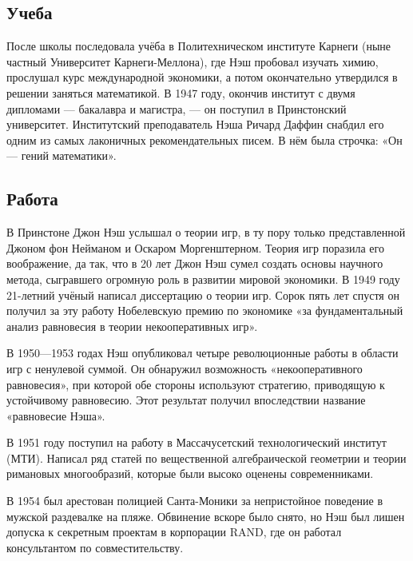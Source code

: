 \documentclass[12pt, a4paper]{article}
\begin{document}
\subsection{Учеба}
После школы последовала учёба в Политехническом институте Карнеги
(ныне частный Университет Карнеги-Меллона), где Нэш пробовал изучать химию,
прослушал курс международной экономики, а потом окончательно утвердился в
решении заняться математикой. В 1947 году, окончив институт с двумя
дипломами — бакалавра и магистра, — он поступил в Принстонский университет.
Институтский преподаватель Нэша Ричард Даффин снабдил его одним из самых
лаконичных рекомендательных писем. В нём была строчка: «Он — гений математики».

\subsection{Работа}
В Принстоне Джон Нэш услышал о теории игр, в ту пору только представленной
Джоном фон Нейманом и Оскаром Моргенштерном. Теория игр поразила его
воображение, да так, что в 20 лет Джон Нэш сумел создать основы научного
метода, сыгравшего огромную роль в развитии мировой экономики. В 1949 году
21-летний учёный написал диссертацию о теории игр. Сорок пять лет спустя он
получил за эту работу Нобелевскую премию по экономике «за фундаментальный
анализ равновесия в теории некооперативных игр».

В 1950—1953 годах Нэш опубликовал четыре революционные работы в области игр с
ненулевой суммой. Он обнаружил возможность «некооперативного равновесия», при
которой обе стороны используют стратегию, приводящую к устойчивому равновесию.
Этот результат получил впоследствии название «равновесие Нэша».

В 1951 году поступил на работу в Массачусетский технологический институт (МТИ).
Написал ряд статей по вещественной алгебраической геометрии и теории римановых
многообразий, которые были высоко оценены современниками.

В 1954 был арестован полицией Санта-Моники за непристойное поведение в мужской
раздевалке на пляже. Обвинение вскоре было снято, но Нэш был лишен допуска
к секретным проектам в корпорации RAND, где он работал консультантом по
совместительству.
\end{document}
